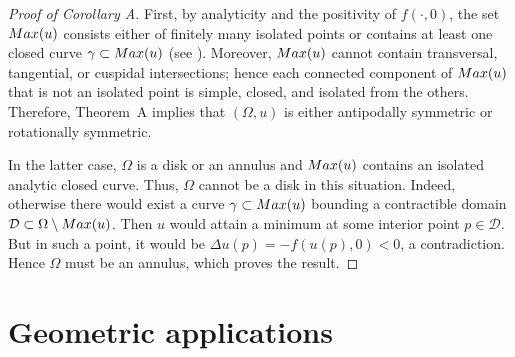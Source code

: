\documentclass[11pt]{article}
\def\r{\hbox{\bb R}}
\def\s{\hbox{\bb S}}
\numberwithin{equation} {section}
\begin{document}
\begin{proof}[Proof of Corollary A]
First, by analyticity and the positivity of $f(\cdot,0)$, the set $\textup{Max}(u)$ consists either of finitely many isolated points or contains at least one closed curve $\gamma\subset\textup{Max}(u)$ (see \cite[Corollary~3.4]{Chr}). Moreover, $\textup{Max}(u)$ cannot contain transversal, tangential, or cuspidal intersections; hence each connected component of $\textup{Max}(u)$ that is not an isolated point is simple, closed, and isolated from the others. Therefore, Theorem~A implies that $(\Omega,u)$ is either antipodally symmetric or rotationally symmetric.

In the latter case, $\Omega$ is a disk or an annulus and $\textup{Max}(u)$ contains an isolated analytic closed curve. Thus, $\Omega$ cannot be a disk in this situation. Indeed, otherwise there would exist a curve $\gamma\subset\textup{Max}(u)$ bounding a contractible domain $\mathcal{D}\subset \Omega\setminus\textup{Max}(u)$. Then $u$ would attain a minimum at some interior point $p \in \mathcal{D}$. But in such a point, it would be $\Delta u (p) = -f(u(p),0) <0$, a contradiction. Hence $\Omega$ must be an annulus, which proves the result.

\end{proof}

\section{Geometric applications}\label{SectGA}
\end{document}
